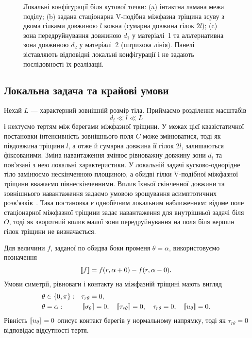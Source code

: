 \begin{figure}[htbp]
  \centering
  
  \caption{Локальні конфігурації біля кутової точки:
  (a) інтактна ламана межа поділу; (b) задана стаціонарна V-подібна
  міжфазна тріщина зсуву з двома гілками довжиною $l$ кожна
  (сумарна довжина гілок $2l$); (c) зона передруйнування довжиною $d_1$ у матеріалі~1 та
  альтернативна зона довжиною $d_2$ у матеріалі~2 (штрихова лінія).
  Панелі зіставляють відповідні локальні конфігурації і не задають
  послідовності їх реалізації.}
  \label{fig:failure-stages}
\end{figure}

\subsection{Локальна задача та крайові умови}
\label{subsec:boundary-conditions}

Нехай $L$ --- характерний зовнішній розмір тіла. Приймаємо розділення
масштабів
\begin{equation*}
  d_i\ll l\ll L
\end{equation*}
і нехтуємо тертям між берегами міжфазної тріщини. У межах цієї
квазістатичної постановки інтенсивність зовнішнього поля $C$ може
змінюватися, тоді як півдовжина тріщини $l$, а отже й сумарна довжина
її гілок $2l$, залишаються фіксованими. Зміна навантаження змінює
рівноважну довжину зони $d_i$ та пов'язані з нею локальні
характеристики. У локальній задачі
кусково-однорідне тіло замінюємо нескінченною площиною, а обидві гілки
V-подібної міжфазної тріщини вважаємо півнескінченними. Вплив їхньої
скінченної довжини та зовнішнього
навантаження задаємо умовою зрощування асимптотичних розв'язків~\cite{Nayfeh1973Perturbation}.
Така постановка є однобічним локальним наближенням: відоме поле
стаціонарної міжфазної тріщини задає навантаження для внутрішньої задачі
біля $O$, тоді як зворотний вплив малої зони передруйнування на поля
біля вершин гілок тріщини не визначається.

Для величини $f$, заданої по обидва боки променя $\theta=\alpha$,
використовуємо позначення
\begin{equation*}
  \left[\!\left[f\right]\!\right]
  =f(r,\alpha+0)-f(r,\alpha-0).
\end{equation*}
Умови симетрії, рівноваги і контакту на міжфазній тріщині мають вигляд
\begin{equation}
\label{eq:interface-boundary-conditions}
\begin{aligned}
  &\theta\in\{0,\pi\}: &&\tau_{r\theta}=0,\\
  &\theta=\alpha: &&
    \left[\!\left[\sigma_\theta\right]\!\right]=0,
    \quad \left[\!\left[\tau_{r\theta}\right]\!\right]=0,
    \quad \tau_{r\theta}=0,
    \quad \left[\!\left[u_\theta\right]\!\right]=0.
\end{aligned}
\end{equation}
Рівність $\left[\!\left[u_\theta\right]\!\right]=0$ описує контакт берегів у
нормальному напрямку, тоді як $\tau_{r\theta}=0$ відповідає відсутності
тертя.

